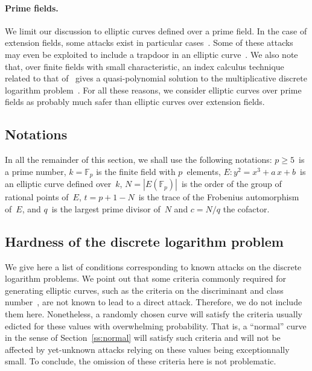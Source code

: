 \documentclass[twocolumn,letterpaper,10pt]{article}
\def\F{\mathbb{F}}
\def\abs#1{\left|#1\right|}
\begin{document}
\paragraph{Prime fields.}%
We limit our discussion to elliptic curves defined over a prime field.
In the case of extension fields,
some attacks exist in particular
cases~\cite{jc2013jv,rsa2004mtw,asia1999dgm,jc2002ghs}.
Some of these attacks may even be exploited
to include a trapdoor in an elliptic curve~\cite{jc2006teske}.
We also note that, over finite fields with small characteristic,
an index calculus technique related to that of~\cite{jc2013jv}
gives a quasi-polynomial solution to
the multiplicative discrete logarithm problem~\cite{euro2014bgjt}.
For all these reasons, we consider elliptic curves over prime fields
as probably much safer than elliptic curves over extension fields.


\subsection*{Notations}
In all the remainder of this section,
we shall use the following notations:
$p ≥ 5$~is a prime number,
$k = \F_{p}$ is the finite field with $p$~elements,
$E: y^2 = x^3 + a\,x + b$~is an elliptic curve defined over~$k$,
$N = \abs{E(\F_p)}$~is the order of the group of rational points of~$E$,
$t = p + 1 - N$~is the trace of the Frobenius automorphism of~$E$,
and $q$~is the largest prime divisor of~$N$ and $c = N/q$ the cofactor.

\subsection{Hardness of the discrete logarithm problem}
\label{ss:dlp}

We give here a list of conditions corresponding to
known attacks on the discrete logarithm problems.
We point out that some criteria commonly required
for generating elliptic curves,
such as the criteria on the discriminant and class number~\cite{rfc5639},
are not known to lead to a direct attack.
Therefore, we do not include them here.
Nonetheless, a randomly chosen curve will satisfy the
criteria usually edicted for these values with overwhelming probability.
That is, a “normal” curve in the sense of Section~\ref{ss:normal}
will satisfy such criteria and will not be affected by yet-unknown
attacks relying on these values being exceptionnally small.
To conclude, the omission of these criteria here is not problematic.
\end{document}
